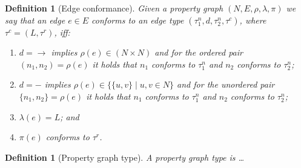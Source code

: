 \documentclass[a4paper]{article}
\newtheorem{definition}[theorem]{Definition}
\newcommand{\rtype}{\tau^r}
\newcommand{\ctype}{\tau^c}
\newcommand{\ntype}{\tau^n}
\begin{document}
\begin{definition}[Edge conformance]
  Given a property graph $(N, E, \rho, \lambda, \pi)$ we say that an edge $e \in E$ \emph{conforms} to an edge type $(\ntype_1, d, \ntype_2, \ctype)$, where $\ctype = (L, \rtype)$, iff:
  \begin{enumerate}
    \item $d = \rightarrow$ implies $\rho(e) \in (N \times N)$ and for the ordered pair $(n_1, n_2) = \rho(e)$ it holds that $n_1$ conforms to $\ntype_1$ and $n_2$ conforms to $\ntype_2$;
    \item $d = -$ implies $\rho(e) \in \{\{u, v\} \mid u, v \in N\}$ and for the unordered pair $\{n_1, n_2\} = \rho(e)$ it holds that $n_1$ conforms to $\ntype_1$ and $n_2$ conforms to $\ntype_2$;
    \item $\lambda(e) = L$; and
    \item $\pi(e)$ conforms to $\rtype$.
  \end{enumerate}
\end{definition}

\begin{definition}[Property graph type]
  A \emph{property graph type} is \ldots
\end{definition}
\end{document}

